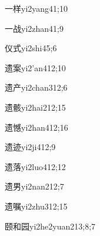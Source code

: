 \begin{verbete}{一样}{yi2yang4}{1;10}
\end{verbete}

\begin{verbete}{一战}{yi2zhan4}{1;9}
\end{verbete}

\begin{verbete}{仪式}{yi2shi4}{5;6}
\end{verbete}

\begin{verbete}{遗案}{yi2'an4}{12;10}
\end{verbete}

\begin{verbete}{遗产}{yi2chan3}{12;6}
\end{verbete}

\begin{verbete}{遗骸}{yi2hai2}{12;15}
\end{verbete}

\begin{verbete}{遗憾}{yi2han4}{12;16}
\end{verbete}

\begin{verbete}{遗迹}{yi2ji4}{12;9}
\end{verbete}

\begin{verbete}{遗落}{yi2luo4}{12;12}
\end{verbete}

\begin{verbete}{遗男}{yi2nan2}{12;7}
\end{verbete}

\begin{verbete}{遗嘱}{yi2zhu3}{12;15}
\end{verbete}

\begin{verbete}{颐和园}{yi2he2yuan2}{13;8;7}
\end{verbete}

